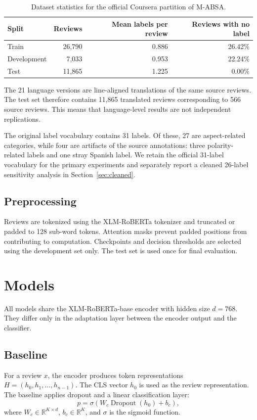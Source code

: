 \documentclass[review,12pt]{elsarticle}
\begin{document}
\begin{table}[htbp]
\centering
\caption{Dataset statistics for the official Coursera partition of M-ABSA.}
\label{tab:dataset}
\begin{tabular}{lrrr}
\toprule
Split & Reviews & Mean labels per review & Reviews with no label \\
\midrule
Train & 26,790 & 0.886 & 26.42\% \\
Development & 7,033 & 0.953 & 22.24\% \\
Test & 11,865 & 1.225 & 0.00\% \\
\bottomrule
\end{tabular}
\end{table}

The 21 language versions are line-aligned translations of the same source reviews. The test set therefore contains 11,865 translated reviews corresponding to 566 source reviews. This means that language-level results are not independent replications.

The original label vocabulary contains 31 labels. Of these, 27 are aspect-related categories, while four are artifacts of the source annotations: three polarity-related labels and one stray Spanish label. We retain the official 31-label vocabulary for the primary experiments and separately report a cleaned 26-label sensitivity analysis in Section~\ref{sec:cleaned}.

\subsection{Preprocessing}
Reviews are tokenized using the XLM-RoBERTa tokenizer and truncated or padded to 128 sub-word tokens. Attention masks prevent padded positions from contributing to computation. Checkpoints and decision thresholds are selected using the development set only. The test set is used once for final evaluation.

\section{Models}
All models share the XLM-RoBERTa-base encoder with hidden size $d=768$. They differ only in the adaptation layer between the encoder output and the classifier.

\subsection{Baseline}
For a review $x$, the encoder produces token representations $H=(h_0,h_1,\ldots,h_{n-1})$. The CLS vector $h_0$ is used as the review representation. The baseline applies dropout and a linear classification layer:
\begin{equation}
p=\sigma(W_c\operatorname{Dropout}(h_0)+b_c),
\end{equation}
where $W_c\in\mathbb{R}^{K\times d}$, $b_c\in\mathbb{R}^K$, and $\sigma$ is the sigmoid function.
\end{document}
